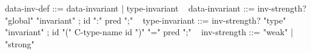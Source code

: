\begin{syntax}
  { data-inv-def } ::= { data-invariant } | { type-invariant }
  \
  { data-invariant } ::= { { inv-strength? } "global" "invariant" } ;
                      { id ":" pred ";" } 
  \
  { type-invariant } ::= { { inv-strength? } "type" "invariant" };
                      { id "(" C-type-name id ")" "=" pred ";" }
  \
  { inv-strength } ::= { "weak" } | { "strong" }
\end{syntax}
